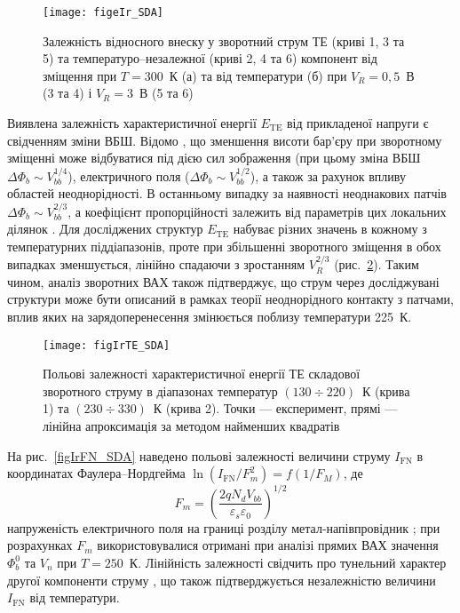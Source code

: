 \begin{figure}
\center
\texttt{[image: figeIr\_SDA]}
\caption{\label{figeIr_SDA}
Залежність відносного внеску у зворотний струм
ТЕ (криві 1, 3 та 5) та температуро--незалежної (криві 2, 4 та 6)
компонент від зміщення при $T=300$~К (а) та
від температури (б) при $V_R=0,5$~В (3 та 4) і $V_R=3$~В (5 та 6)
}%
\end{figure}

Виявлена залежність характеристичної енергії $E_\mathrm{TE}$ від прикладеної напруги є свідченням зміни ВБШ.
Відомо \cite{Rhoderick1988,Tung:PhysRev,Andrews}, що зменшення висоти бар'єру при зворотному зміщенні може відбуватися під дією сил зображення
(при цьому  зміна ВБШ $\Delta\Phi_b\sim V_{bb}^{1/4}$),
електричного поля ($\Delta\Phi_b\sim V_{bb}^{1/2}$),
а також за рахунок впливу областей неоднорідності.
В останньому випадку за наявності неоднакових патчів $\Delta\Phi_b\sim V_{bb}^{2/3}$, а коефіцієнт пропорційності залежить від параметрів цих локальних ділянок \cite{Tung:PhysRev}.
Для досліджених структур $E_\mathrm{TE}$ набуває різних значень в кожному з температурних піддіапазонів,
проте при збільшенні зворотного зміщення в обох випадках зменшується, лінійно спадаючи з зростанням $V^{2/3}_R$ (рис.~\ref{figIrTE_SDA}).
Таким чином, аналіз зворотних ВАХ також підтверджує,
що струм через досліджувані структури може бути описаний в рамках теорії неоднорідного контакту з патчами,
вплив яких на зарядоперенесення змінюється поблизу температури 225~К.



\begin{figure}
\center
\texttt{[image: figIrTE\_SDA]}
\caption{\label{figIrTE_SDA}
Польові залежності характеристичної енергії ТЕ складової зворотного струму
в діапазонах температур  $(130\div220)$~К (крива 1) та   $(230\div330)$~К (крива 2).
Точки --- експеримент, прямі --- лінійна апроксимація за методом найменших квадратів
}%
\end{figure}

На рис.~\ref{figIrFN_SDA} наведено польові залежності величини струму $I_\mathrm{FN}$ в координатах Фаулера--Нордгейма
$\ln(I_\mathrm{FN}/F_m^2)=f(1/F_M)$,
де
\begin{equation}\label{eqFm}
  F_m=\left(\frac{2qN_{d}V_{bb}}{\varepsilon_s\varepsilon_0}\right)^{1/2}
\end{equation}
напруженість електричного поля на границі розділу метал-напівпровідник \cite{Rhoderick1988};
при розрахунках $F_m$ використовувалися отримані при аналізі прямих ВАХ значення $\Phi^0_b$ та  $V_n$ при $T=250$~К.
Лінійність залежності свідчить про тунельний характер другої компоненти струму \cite{Evtuh},
що також підтверджується незалежністю величини $I_\mathrm{FN}$ від температури.


